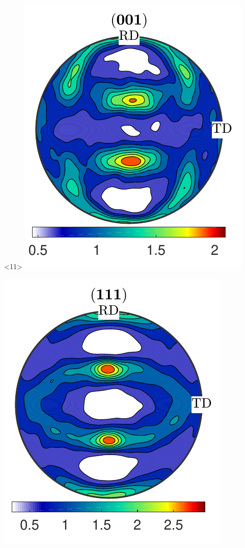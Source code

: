 \documentclass[compress]{beamer}
\begin{document}
\begin{frame}[fragile]
\begin{columns}
\begin{column}{0.29\textwidth}
                        \begin{onlyenv}<11>
        \includegraphics[width=\textwidth]{pic/rolling001_8}

      \includegraphics[width=\textwidth]{pic/rolling111_8}
    \end{onlyenv}


\end{column}
\end{columns}
\end{frame}
\end{document}
